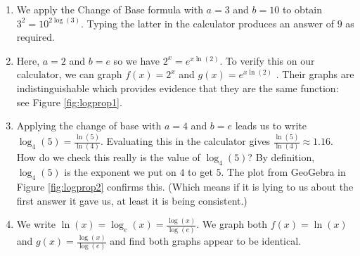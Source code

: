 {
\begin{enumerate}

\item  We apply the Change of Base formula with $a=3$ and $b=10$ to obtain $3^2 = 10^{2 \log(3)}$. Typing the latter in the calculator produces an answer of $9$ as required.

\item  Here, $a=2$ and $b = e$ so we have $2^{x} = e^{x \ln(2)}$.  To verify this on our calculator, we can graph $f(x) = 2^x$  and $g(x) = e^{x \ln(2)}$ .  Their graphs are indistinguishable which provides evidence that they are the same function: see Figure \ref{fig:logprop1}.


\item  Applying the change of base with $a=4$ and $b=e$ leads us to write $\log_{4}(5) = \frac{\ln(5)}{\ln(4)}$.  Evaluating this in the calculator gives $\frac{\ln(5)}{\ln(4)} \approx 1.16$.  How do we check this really is the value of $\log_{4}(5)$?  By definition, $\log_{4}(5)$ is the exponent we put on $4$ to get $5$.  The plot from GeoGebra in Figure \ref{fig:logprop2} confirms this. (Which means if it is lying to us about the first answer it gave us, at least it is being consistent.) 

\item  We write $\ln(x) = \log_{e}(x) = \frac{\log(x)}{\log(e)}$.  We graph both $f(x) = \ln(x)$ and $g(x) = \frac{\log(x)}{\log(e)}$ and find both graphs appear to be identical.


\end{enumerate}

}


